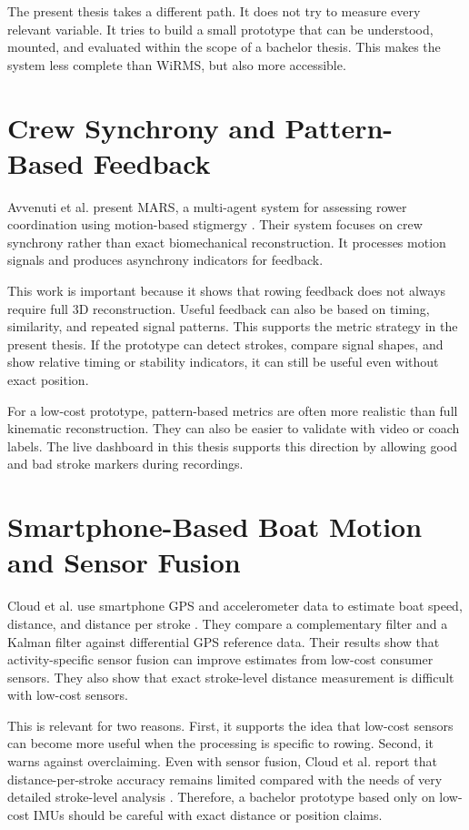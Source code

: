 The present thesis takes a different path. It does not try to measure every relevant variable. It tries to build a small prototype that can be understood, mounted, and evaluated within the scope of a bachelor thesis. This makes the system less complete than WiRMS, but also more accessible.

\section{Crew Synchrony and Pattern-Based Feedback}

Avvenuti et al. present MARS, a multi-agent system for assessing rower coordination using motion-based stigmergy \cite{avvenuti_mars_2013}. Their system focuses on crew synchrony rather than exact biomechanical reconstruction. It processes motion signals and produces asynchrony indicators for feedback.

This work is important because it shows that rowing feedback does not always require full 3D reconstruction. Useful feedback can also be based on timing, similarity, and repeated signal patterns. This supports the metric strategy in the present thesis. If the prototype can detect strokes, compare signal shapes, and show relative timing or stability indicators, it can still be useful even without exact position.

For a low-cost prototype, pattern-based metrics are often more realistic than full kinematic reconstruction. They can also be easier to validate with video or coach labels. The live dashboard in this thesis supports this direction by allowing good and bad stroke markers during recordings.

\section{Smartphone-Based Boat Motion and Sensor Fusion}

Cloud et al. use smartphone GPS and accelerometer data to estimate boat speed, distance, and distance per stroke \cite{cloud_adaptive_2019}. They compare a complementary filter and a Kalman filter against differential GPS reference data. Their results show that activity-specific sensor fusion can improve estimates from low-cost consumer sensors. They also show that exact stroke-level distance measurement is difficult with low-cost sensors.

This is relevant for two reasons. First, it supports the idea that low-cost sensors can become more useful when the processing is specific to rowing. Second, it warns against overclaiming. Even with sensor fusion, Cloud et al. report that distance-per-stroke accuracy remains limited compared with the needs of very detailed stroke-level analysis \cite{cloud_adaptive_2019}. Therefore, a bachelor prototype based only on low-cost IMUs should be careful with exact distance or position claims.

